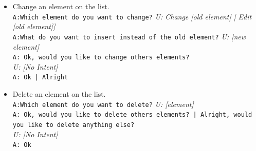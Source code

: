 \begin{itemize}
\begin{itemize}
		\item Change an element on the list.\\
		\texttt{A:Which element do you want to change?}
	    \textit{U: Change [old element]  | Edit [old element]]}\\
	    \texttt{A:What do you want to insert instead of the old element?}
	     \textit{U: [new element]}\\
	    \texttt{A: Ok, would you like to change others elements?}\\
	     \textit{U: [No Intent] }\\
	    \texttt{A: Ok | Alright}
		

		
		
		\item Delete an element on the list.\\
		\texttt{A:Which element do you want to delete?}
		\textit{U: [element]}\\
		\texttt{A: Ok, would you like to delete others elements? | Alright, would you like to delete anything else?}\\
		\textit{U: [No Intent] }\\
		\texttt{A: Ok}
			

\end{itemize}
\end{itemize}
